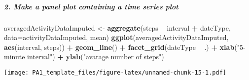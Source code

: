 \documentclass[]{article}
\newenvironment{Shaded}{\begin{snugshade}}{\end{snugshade}}
\newcommand{\KeywordTok}[1]{\textcolor[rgb]{0.13,0.29,0.53}{\textbf{#1}}}
\newcommand{\DataTypeTok}[1]{\textcolor[rgb]{0.13,0.29,0.53}{#1}}
\newcommand{\DecValTok}[1]{\textcolor[rgb]{0.00,0.00,0.81}{#1}}
\newcommand{\StringTok}[1]{\textcolor[rgb]{0.31,0.60,0.02}{#1}}
\newcommand{\OperatorTok}[1]{\textcolor[rgb]{0.81,0.36,0.00}{\textbf{#1}}}
\newcommand{\NormalTok}[1]{#1}
\let\oldsubparagraph\subparagraph
\renewcommand{\subparagraph}[1]{\oldsubparagraph{#1}\mbox{}}
\begin{document}
\begin{Shaded}
\end{Shaded}

\subparagraph{2. Make a panel plot containing a time series
plot}\label{make-a-panel-plot-containing-a-time-series-plot}

\begin{Shaded}
\begin{Highlighting}[]
\NormalTok{averagedActivityDataImputed <-}\StringTok{ }\KeywordTok{aggregate}\NormalTok{(steps }\OperatorTok{~}\StringTok{ }\NormalTok{interval }\OperatorTok{+}\StringTok{ }\NormalTok{dateType, }\DataTypeTok{data=}\NormalTok{activityDataImputed, mean)}
\KeywordTok{ggplot}\NormalTok{(averagedActivityDataImputed, }\KeywordTok{aes}\NormalTok{(interval, steps)) }\OperatorTok{+}\StringTok{ }
\StringTok{    }\KeywordTok{geom_line}\NormalTok{() }\OperatorTok{+}\StringTok{ }
\StringTok{    }\KeywordTok{facet_grid}\NormalTok{(dateType }\OperatorTok{~}\StringTok{ }\NormalTok{.) }\OperatorTok{+}
\StringTok{    }\KeywordTok{xlab}\NormalTok{(}\StringTok{"5-minute interval"}\NormalTok{) }\OperatorTok{+}\StringTok{ }
\StringTok{    }\KeywordTok{ylab}\NormalTok{(}\StringTok{"avarage number of steps"}\NormalTok{)}
\end{Highlighting}
\end{Shaded}

\texttt{[image: PA1\_template\_files/figure-latex/unnamed-chunk-15-1.pdf]}
\end{document}

